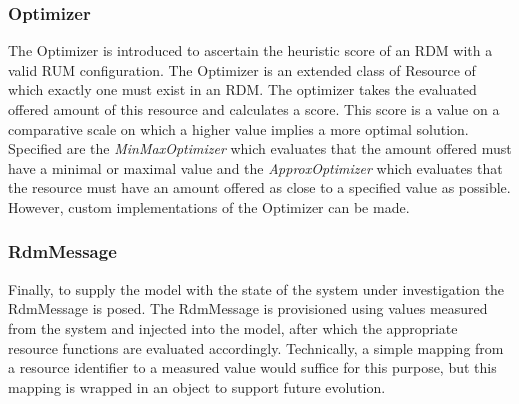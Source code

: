 \subsubsection{Optimizer}
The Optimizer is introduced to ascertain the heuristic score of an RDM with a valid RUM configuration. The Optimizer is an extended class of Resource of which exactly one must exist in an RDM. The optimizer takes the evaluated offered amount of this resource and calculates a score. This score is a value on a comparative scale on which a higher value implies a more optimal solution. Specified are the \emph{MinMaxOptimizer} which evaluates that the amount offered must have a minimal or maximal value and the \emph{ApproxOptimizer} which evaluates that the resource must have an amount offered as close to a specified value as possible. However, custom implementations of the Optimizer can be made.

\subsubsection{RdmMessage}
Finally, to supply the model with the state of the system under investigation the RdmMessage is posed. The RdmMessage is provisioned using values measured from the system and injected into the model, after which the appropriate resource functions are evaluated accordingly. Technically, a simple mapping from a resource identifier to a measured value would suffice for this purpose, but this mapping is wrapped in an object to support future evolution.


